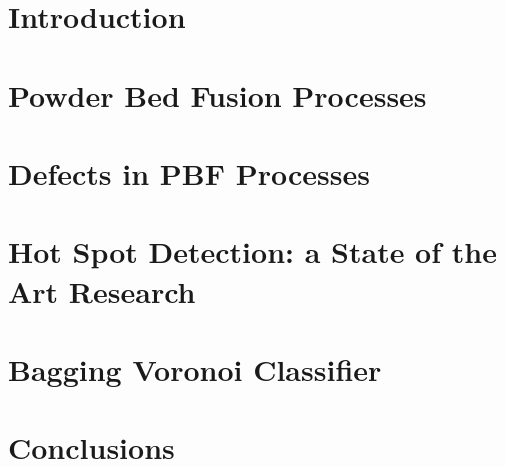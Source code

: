 \documentclass{Configuration_Files/PoliMi3i_thesis}
\begin{document}


\chapter{Introduction}
\label{ch:Introduction}%



\chapter{Powder Bed Fusion Processes}
\label{ch:Metal_AM}



\chapter{Defects in PBF Processes}
\label{ch:defects}



\chapter{Hot Spot Detection: a State of the Art Research}
\label{ch:state_ot_the_art}
 


\chapter{Bagging Voronoi Classifier}
\label{ch:baggingvoronoi}



\chapter{Conclusions}
\label{ch:conclusions}


\end{document}
